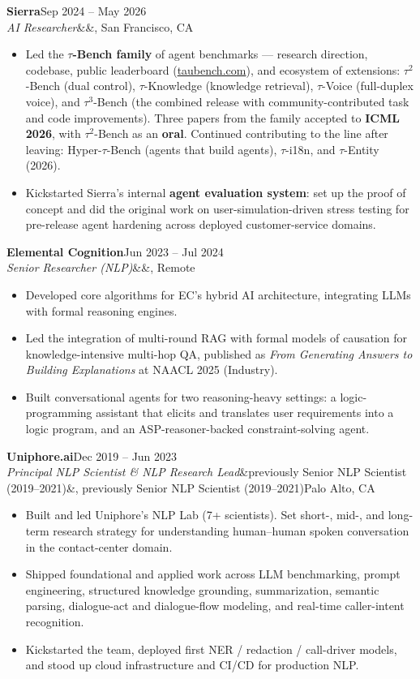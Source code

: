 \documentclass[10.5pt,a4paper]{article}
\newcommand{\position}[5]{%
  \noindent
  \textbf{#1}\hfill\textcolor{muted}{#3}\\
  \textit{#4}\ifx&#5&\else, #5\fi\hfill\textcolor{muted}{#2}\par
  \vspace{2pt}
}
\begin{document}
\position{Sierra}{San Francisco, CA}{Sep 2024 – May 2026}
  {AI Researcher}{}
\begin{itemize}
  \item Led the \textbf{$\tau$-Bench family} of agent benchmarks --- research direction, codebase, public leaderboard (\href{https://taubench.com}{taubench.com}), and ecosystem of extensions: $\tau^2$-Bench (dual control), $\tau$-Knowledge (knowledge retrieval), $\tau$-Voice (full-duplex voice), and $\tau^3$-Bench (the combined release with community-contributed task and code improvements). Three papers from the family accepted to \textbf{ICML 2026}, with $\tau^2$-Bench as an \textbf{oral}. Continued contributing to the line after leaving: Hyper-$\tau$-Bench (agents that build agents), $\tau$-i18n, and $\tau$-Entity (2026).
  \item Kickstarted Sierra's internal \textbf{agent evaluation system}: set up the proof of concept and did the original work on user-simulation-driven stress testing for pre-release agent hardening across deployed customer-service domains.
\end{itemize}

\position{Elemental Cognition}{Remote}{Jun 2023 – Jul 2024}
  {Senior Researcher (NLP)}{}
\begin{itemize}
  \item Developed core algorithms for EC's hybrid AI architecture, integrating LLMs with formal reasoning engines.
  \item Led the integration of multi-round RAG with formal models of causation for knowledge-intensive multi-hop QA, published as \emph{From Generating Answers to Building Explanations} at NAACL 2025 (Industry).
  \item Built conversational agents for two reasoning-heavy settings: a logic-programming assistant that elicits and translates user requirements into a logic program, and an ASP-reasoner-backed constraint-solving agent.
\end{itemize}

\position{Uniphore.ai}{Palo Alto, CA}{Dec 2019 – Jun 2023}
  {Principal NLP Scientist \& NLP Research Lead}{previously Senior NLP Scientist (2019–2021)}
\begin{itemize}
  \item Built and led Uniphore's NLP Lab (7+ scientists). Set short-, mid-, and long-term research strategy for understanding human–human spoken conversation in the contact-center domain.
  \item Shipped foundational and applied work across LLM benchmarking, prompt engineering, structured knowledge grounding, summarization, semantic parsing, dialogue-act and dialogue-flow modeling, and real-time caller-intent recognition.
  \item Kickstarted the team, deployed first NER / redaction / call-driver models, and stood up cloud infrastructure and CI/CD for production NLP.
\end{itemize}
\end{document}
